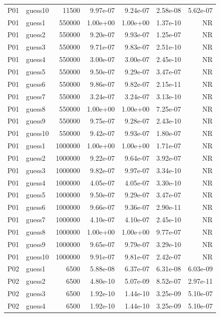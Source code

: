 {\begin{longtable}{llrrrrr}
P01 & guess10 & 11500 & 9.97e-07 & 9.24e-07 & 2.58e-08 & 5.62e-07 \\
P01 & guess1 & 550000 & 1.00e+00 & 1.00e+00 & 1.37e-10 & NR \\
P01 & guess2 & 550000 & 9.20e-07 & 9.93e-07 & 1.25e-07 & NR \\
P01 & guess3 & 550000 & 9.71e-07 & 9.83e-07 & 2.51e-10 & NR \\
P01 & guess4 & 550000 & 3.00e-07 & 3.00e-07 & 2.45e-10 & NR \\
P01 & guess5 & 550000 & 9.50e-07 & 9.29e-07 & 3.47e-07 & NR \\
P01 & guess6 & 550000 & 9.86e-07 & 9.82e-07 & 2.15e-11 & NR \\
P01 & guess7 & 550000 & 3.24e-07 & 3.24e-07 & 3.13e-10 & NR \\
P01 & guess8 & 550000 & 1.00e+00 & 1.00e+00 & 7.25e-07 & NR \\
P01 & guess9 & 550000 & 9.75e-07 & 9.28e-07 & 2.43e-10 & NR \\
P01 & guess10 & 550000 & 9.42e-07 & 9.93e-07 & 1.80e-07 & NR \\
P01 & guess1 & 1000000 & 1.00e+00 & 1.00e+00 & 1.71e-07 & NR \\
P01 & guess2 & 1000000 & 9.22e-07 & 9.64e-07 & 3.92e-07 & NR \\
P01 & guess3 & 1000000 & 9.82e-07 & 9.97e-07 & 3.34e-10 & NR \\
P01 & guess4 & 1000000 & 4.05e-07 & 4.05e-07 & 3.30e-10 & NR \\
P01 & guess5 & 1000000 & 9.50e-07 & 9.29e-07 & 3.47e-07 & NR \\
P01 & guess6 & 1000000 & 9.66e-07 & 9.36e-07 & 2.90e-11 & NR \\
P01 & guess7 & 1000000 & 4.10e-07 & 4.10e-07 & 2.45e-10 & NR \\
P01 & guess8 & 1000000 & 1.00e+00 & 1.00e+00 & 9.77e-07 & NR \\
P01 & guess9 & 1000000 & 9.65e-07 & 9.79e-07 & 3.29e-10 & NR \\
P01 & guess10 & 1000000 & 9.91e-07 & 9.81e-07 & 2.42e-07 & NR \\
P02 & guess1 & 6500 & 5.88e-08 & 6.37e-07 & 6.31e-08 & 6.03e-09 \\
P02 & guess2 & 6500 & 4.80e-10 & 5.07e-09 & 8.52e-07 & 2.97e-11 \\
P02 & guess3 & 6500 & 1.92e-10 & 1.44e-10 & 3.25e-09 & 5.10e-07 \\
P02 & guess4 & 6500 & 1.92e-10 & 1.44e-10 & 3.25e-09 & 5.10e-07 \\

\end{longtable}}

